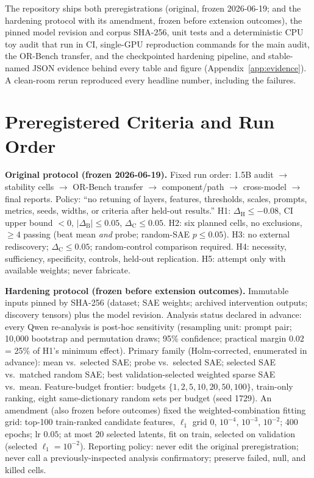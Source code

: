 \documentclass[11pt]{article}
\newcommand{\dH}{\ensuremath{\Delta_{\mathrm{H}}}}
\newcommand{\dB}{\ensuremath{\Delta_{\mathrm{B}}}}
\newcommand{\dC}{\ensuremath{\Delta_{\mathrm{C}}}}
\begin{document}
The repository ships both preregistrations (original, frozen 2026-06-19; and
the hardening protocol with its amendment, frozen before extension outcomes),
the pinned model revision and corpus SHA-256, unit tests and a deterministic
CPU toy audit that run in CI, single-GPU reproduction commands for the main
audit, the OR-Bench transfer, and the checkpointed hardening pipeline, and
stable-named JSON evidence behind every table and figure
(Appendix~\ref{app:evidence}).  A clean-room rerun reproduced every headline
number, including the failures.

\section{Preregistered Criteria and Run Order}
\label{app:prereg}

\textbf{Original protocol (frozen 2026-06-19).}  Fixed run order: 1.5B audit
$\to$ stability cells $\to$ OR-Bench transfer $\to$ component/path $\to$
cross-model $\to$ final reports.  Policy: ``no retuning of layers, features,
thresholds, scales, prompts, metrics, seeds, widths, or criteria after
held-out results.''  H1: $\dH\le-0.08$, CI upper bound $<0$, $|\dB|\le0.05$,
$\dC\le0.05$.  H2: six planned cells, no exclusions, $\ge4$ passing (beat
mean \emph{and} probe; random-SAE $p\le0.05$).  H3: no external rediscovery;
$\dC\le0.05$; random-control comparison required.  H4: necessity,
sufficiency, specificity, controls, held-out replication.  H5: attempt only
with available weights; never fabricate.

\textbf{Hardening protocol (frozen before extension outcomes).}  Immutable
inputs pinned by SHA-256 (dataset; SAE weights; archived intervention
outputs; discovery tensors) plus the model revision.  Analysis status
declared in advance: every Qwen re-analysis is post-hoc sensitivity
(resampling unit: prompt pair; 10{,}000 bootstrap and permutation draws;
95\% confidence; practical margin $0.02$ = 25\% of H1's minimum effect).
Primary family (Holm-corrected, enumerated in advance): mean vs.\ selected
SAE; probe vs.\ selected SAE; selected SAE vs.\ matched random SAE; best
validation-selected weighted sparse SAE vs.\ mean.  Feature-budget frontier:
budgets $\{1,2,5,10,20,50,100\}$, train-only ranking, eight same-dictionary
random sets per budget (seed 1729).  An amendment (also frozen before
outcomes) fixed the weighted-combination fitting grid: top-100 train-ranked
candidate features, $\ell_1$ grid $0$, $10^{-4}$, $10^{-3}$, $10^{-2}$; 400
epochs; lr $0.05$; at most 20 selected latents, fit on train, selected on
validation (selected $\ell_1=10^{-2}$).  Reporting policy: never edit the
original preregistration; never call a previously-inspected analysis
confirmatory; preserve failed, null, and killed cells.
\end{document}
